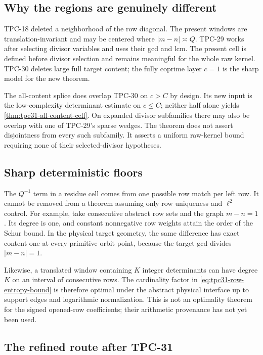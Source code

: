 \subsection{Why the regions are genuinely different}

TPC-18 deleted a neighborhood of the row diagonal.  The present
windows are translation-invariant and may be centered where
$|m-n|\asymp Q$.  TPC-29 works after selecting divisor variables and
uses their gcd and lcm.  The present cell is defined before divisor
selection and remains meaningful for the whole raw kernel.  TPC-30
deletes large full target content; the fully coprime layer $c=1$ is
the sharp model for the new theorem.

The all-content splice does overlap TPC-30 on $c>C$ by design.  Its
new input is the low-complexity determinant estimate on $c\le C$; neither
half alone yields \cref{thm:tpc31-all-content-cell}.  On expanded
divisor subfamilies there may also be overlap with one of TPC-29's
sparse wedges.  The theorem does not assert disjointness from every
such subfamily.  It asserts a uniform raw-kernel bound requiring none
of their selected-divisor hypotheses.

\subsection{Sharp deterministic floors}

The $Q^{-1}$ term in a residue cell comes from one possible row match
per left row.  It cannot be removed from a theorem assuming only row
uniqueness and $\ell^2$ control.  For example, take consecutive
abstract row sets and the graph $m-n=1$.  Its degree is one, and
constant nonnegative row weights attain the order of the Schur bound.
In the physical target geometry, the same difference has exact content
one at every primitive orbit point, because the target gcd divides
$|m-n|=1$.

Likewise, a translated window containing $K$ integer determinants can
have degree $K$ on an interval of consecutive rows.  The cardinality
factor in \eqref{eq:tpc31-row-entropy-bound} is therefore optimal under
the abstract physical interface up to support edges and logarithmic
normalization.  This is not an optimality theorem for the signed
opened-row coefficients; their arithmetic provenance has not yet been
used.

\subsection{The refined route after TPC-31}

